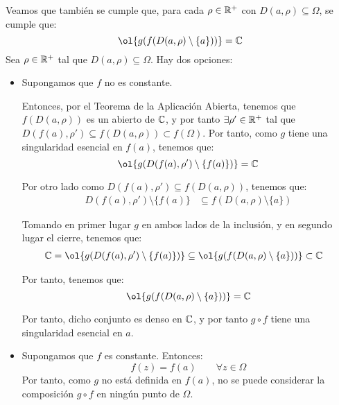 \begin{ejercicio}
    Veamos que también se cumple que, para cada $\rho \in \mathbb{R}^+$ con $D(a, \rho) \subseteq \Omega$, se cumple que:
    \begin{equation*}
        \ol{g(f(D(a, \rho)\setminus \{a\}))} = \bb{C}
    \end{equation*}
    Sea $\rho \in \mathbb{R}^+$ tal que $D(a, \rho) \subseteq \Omega$. Hay dos opciones:
    \begin{itemize}
        \item Supongamos que $f$ no es constante.
        
        Entonces, por el Teorema de la Aplicación Abierta, tenemos que $f(D(a, \rho))$ es un abierto de $\mathbb{C}$, y por tanto $\exists \rho' \in \mathbb{R}^+$ tal que $D(f(a), \rho') \subseteq f(D(a, \rho))\subset f(\Omega)$. Por tanto, como $g$ tiene una singularidad esencial en $f(a)$, tenemos que:
        \begin{equation*}
            \ol{g(D(f(a), \rho')\setminus \{f(a)\})} = \bb{C}
        \end{equation*}

        Por otro lado como $D(f(a), \rho') \subseteq f(D(a, \rho))$, tenemos que:
        \begin{align*}
            D(f(a), \rho') \setminus \{f(a)\} &\subseteq f(D(a, \rho)\setminus \{a\})
        \end{align*}

        Tomando en primer lugar $g$ en ambos lados de la inclusión, y en segundo lugar el cierre, tenemos que:
        \begin{align*}
            \bb{C} = \ol{g(D(f(a), \rho')\setminus \{f(a)\})} &\subseteq \ol{g(f(D(a, \rho)\setminus \{a\}))}\subset \bb{C}
        \end{align*}

        Por tanto, tenemos que:
        \begin{equation*}
            \ol{g(f(D(a, \rho)\setminus \{a\}))} = \bb{C}
        \end{equation*}

        Por tanto, dicho conjunto es denso en $\mathbb{C}$, y por tanto $g \circ f$ tiene una singularidad esencial en $a$.

        \item Supongamos que $f$ es constante. Entonces:
        \begin{equation*}
            f(z) = f(a) \qquad \forall z \in \Omega
        \end{equation*}
        Por tanto, como $g$ no está definida en $f(a)$, no se puede considerar la composición $g \circ f$ en ningún punto de $\Omega$.
    \end{itemize}
    
    
    
\end{ejercicio}

